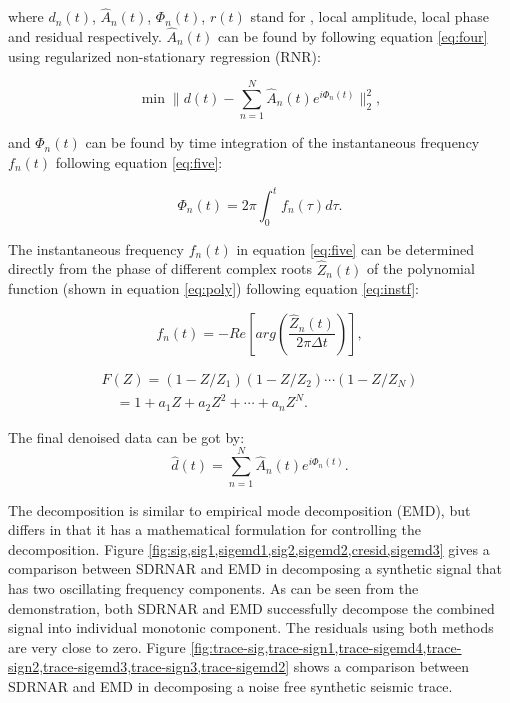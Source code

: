 where $d_n(t)$, $\hat{A}_n(t)$, $\Phi_n(t)$, $r(t)$ stand for , local amplitude, local phase and residual respectively. $\hat{A}_n(t)$ can be found by following equation \ref{eq:four} using regularized non-stationary regression (RNR): 

\begin{equation}
\label{eq:four}
\min\parallel d(t)-\sum_{n=1}^{N}\hat{A}_n(t)e^{i\Phi_n(t)}\parallel_2^2,
\end{equation}

and $\Phi_n(t)$ can be found by time integration of the instantaneous frequency $f_n(t)$ following equation \ref{eq:five}:

\begin{equation}
\label{eq:five}
\Phi_n(t)=2\pi\int_0^t f_n(\tau)d\tau.
\end{equation}

The instantaneous frequency $f_n(t)$ in equation \ref{eq:five} can be determined directly from the phase of different complex roots $\hat Z_n(t)$ of the polynomial function (shown in equation \ref{eq:poly}) following equation \ref{eq:instf}:

\begin{equation}
\label{eq:instf}
f_n(t)=-Re\left[ arg\left(\frac{\hat{Z}_n(t)}{2\pi\Delta t}\right)\right],
\end{equation}

\begin{eqnarray}
\label{eq:poly}
F(Z)=(1-Z/Z_1)(1-Z/Z_2)\cdots(1-Z/Z_N) \\ \nonumber
\quad=1+a_1Z+a_2Z^2+\cdots+a_nZ^N.
\end{eqnarray}



The final denoised data can be got by: 
\begin{equation}
\label{eq:denoise}
\hat{d}(t)=\sum_{n=1}^{N}\hat{A}_n(t)e^{i\Phi_n(t)}.
\end{equation}

The decomposition is similar to empirical mode decomposition (EMD), but differs in that it has a mathematical formulation for controlling the decomposition. Figure \ref{fig:sig,sig1,sigemd1,sig2,sigemd2,cresid,sigemd3} gives a comparison between SDRNAR and EMD in decomposing a synthetic signal that has two oscillating frequency components. As can be seen from the demonstration, both SDRNAR and EMD successfully decompose the combined signal into individual monotonic component. The residuals using both methods are very close to zero. Figure \ref{fig:trace-sig,trace-sign1,trace-sigemd4,trace-sign2,trace-sigemd3,trace-sign3,trace-sigemd2} shows a comparison between SDRNAR and EMD in decomposing a noise free synthetic seismic trace.

